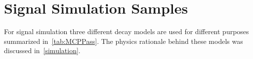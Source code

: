 






\section{Signal Simulation Samples}
\label{SimulationSamples}


For signal simulation three different decay models are used for different purposes summarized in~\autoref{tab:MCPPass}. The physics rationale behind these models was discussed in~\autoref{simulation}.

